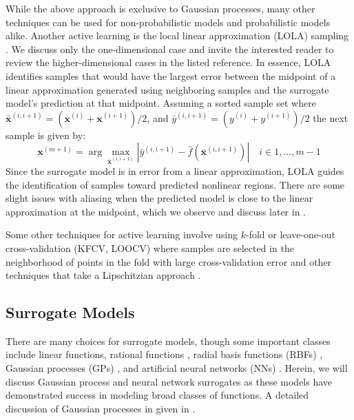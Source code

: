\documentclass[conference,final]{IEEEtran}
\begin{document}
    While the above approach is exclusive to Gaussian processes, many other techniques can be used for non-probabilistic models and probabilistic models alike. Another active learning is the local linear approximation (LOLA) sampling \cite{article}. We discuss only the one-dimensional case and invite the interested reader to review the higher-dimensional cases in the listed reference. In essence, LOLA identifies samples that would have the largest error between the midpoint of a linear approximation generated using neighboring samples and the surrogate model's prediction at that midpoint. Assuming a sorted sample set where $\boldsymbol{\bar{x}}^{(i,i+1)} = (\boldsymbol{x}^{(i)} + \boldsymbol{x}^{(i+1)}) / 2$, and $\bar{y}^{(i,i+1)} = (y^{(i)} + y^{(i+1)})/2$ the next sample is given by:
    \begin{equation}
         \boldsymbol{x}^{(m+1)} = \arg \max_{\boldsymbol{\bar{x}}^{(i,i+1)}} \left| \bar{y}^{(i,i+1)} - \hat{f}\left(\boldsymbol{\bar{x}}^{(i,i+1)}\right) \right| \quad i \in {1, ..., m-1}
    \end{equation}
    Since the surrogate model is in error from a linear approximation, LOLA guides the identification of samples toward predicted nonlinear regions. There are some slight issues with aliasing when the predicted model is close to the linear approximation at the midpoint, which we observe and discuss later in .
    
    Some other techniques for active learning involve using $k$-fold or leave-one-out cross-validation (KFCV, LOOCV) where samples are selected in the neighborhood of points in the fold with large cross-validation error \cite{Kaminsky2018AdaptiveSurfaces} and other techniques that take a Lipschitzian approach \cite{Lovison2010AdaptiveMetamodeling}.

    \subsection{Surrogate Models}
    
    There are many choices for surrogate models, though some important classes include linear functions, rational functions \cite{Hendrickx2005SequentialMetamodelling}, radial basis functions (RBFs) \cite{Mackman2010InvestigationFunctions}, Gaussian processes (GPs) \cite{Simpson2001SamplingAnalysis,VanBeers2005KrigingOverview}, and artificial neural networks (NNs) \cite{Eason2014AdaptiveNetworks}. Herein, we will discuss Gaussian process and neural network surrogates as these models have demonstrated success in modeling broad classes of functions. A detailed discussion of Gaussian processes in given in \cite{williams2006gaussian}.
	
\end{document}
